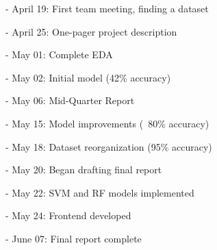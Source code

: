 \documentclass[conference]{IEEEtran}
\begin{document}
- April 19: First team meeting, finding a dataset

- April 25: One-pager project description 

- May 01: Complete EDA

- May 02: Initial model (42\% accuracy)

- May 06: Mid-Quarter Report 

- May 15: Model improvements (~80\% accuracy)

- May 18: Dataset reorganization (95\% accuracy)

- May 20: Began drafting final report

- May 22: SVM and RF models implemented

- May 24: Frontend developed

- June 07: Final report complete
\end{document}

